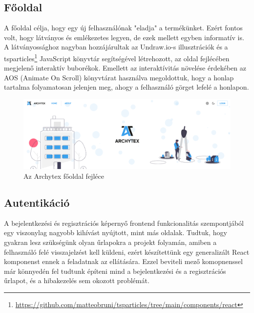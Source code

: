\subsection{Főoldal}
A főoldal célja, hogy egy új felhasználónak "eladja" a termékünket. Ezért fontos volt, hogy látványos és emlékezetes legyen, de ezek mellett egyben informatív is. A látványossághoz nagyban hozzájárultak az Undraw.io-s illusztrációk és a tsparticles\footnote{\url{https://github.com/matteobruni/tsparticles/tree/main/components/react}} JavaScript könyvtár segítségével létrehozott, az oldal fejlécében megjelenő interaktív buborékok. Emellett az interaktívitás növelése érdekében az AOS (Animate On Scroll) könyvtárat használva megoldottuk, hogy a honlap tartalma folyamatosan jelenjen meg, ahogy a felhasználó görget lefelé a honlapon.

\begin{figure}[h]
  \centering
  \includegraphics[width=\textwidth]{parts/developer-documentation/frontend/images/header.png}
  \caption{Az Archytex főoldal fejléce}
\end{figure}

\subsection{Autentikáció}
A bejelentkezési és regisztrációs képernyő frontend funkcionalitás szempontjából egy viszonylag nagyobb kihívást nyújtott, mint más oldalak. Tudtuk, hogy gyakran lesz szükségünk olyan űrlapokra a projekt folyamán, amiben a felhasználó felé visszajelzést kell küldeni, ezért készítettünk egy generalizált React komponenst ennek a feladatnak az ellátására. Ezzel beviteli mező komopnenssel már könnyedén fel tudtunk építeni mind a bejelentkezési és a regisztrációs űrlapot, és a hibakezelés sem okozott problémát.

